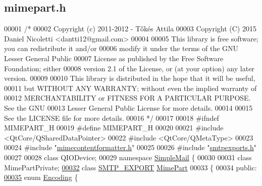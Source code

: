 \hypertarget{mimepart_8h_source}{}\subsection{mimepart.\+h}
\label{mimepart_8h_source}

\begin{DoxyCode}
00001 \textcolor{comment}{/*}
00002 \textcolor{comment}{  Copyright (c) 2011-2012 - Tőkés Attila}
00003 \textcolor{comment}{  Copyright (C) 2015 Daniel Nicoletti <dantti12@gmail.com>}
00004 \textcolor{comment}{}
00005 \textcolor{comment}{  This library is free software; you can redistribute it and/or}
00006 \textcolor{comment}{  modify it under the terms of the GNU Lesser General Public}
00007 \textcolor{comment}{  License as published by the Free Software Foundation; either}
00008 \textcolor{comment}{  version 2.1 of the License, or (at your option) any later version.}
00009 \textcolor{comment}{}
00010 \textcolor{comment}{  This library is distributed in the hope that it will be useful,}
00011 \textcolor{comment}{  but WITHOUT ANY WARRANTY; without even the implied warranty of}
00012 \textcolor{comment}{  MERCHANTABILITY or FITNESS FOR A PARTICULAR PURPOSE.  See the GNU}
00013 \textcolor{comment}{  Lesser General Public License for more details.}
00014 \textcolor{comment}{}
00015 \textcolor{comment}{  See the LICENSE file for more details.}
00016 \textcolor{comment}{*/}
00017 
00018 \textcolor{preprocessor}{#ifndef MIMEPART\_H}
00019 \textcolor{preprocessor}{#define MIMEPART\_H}
00020 
00021 \textcolor{preprocessor}{#include <QtCore/QSharedDataPointer>}
00022 \textcolor{preprocessor}{#include <QtCore/QMetaType>}
00023 
00024 \textcolor{preprocessor}{#include "\hyperlink{mimecontentformatter_8h}{mimecontentformatter.h}"}
00025 
00026 \textcolor{preprocessor}{#include "\hyperlink{smtpexports_8h}{smtpexports.h}"}
00027 
00028 \textcolor{keyword}{class }QIODevice;
00029 \textcolor{keyword}{namespace }\hyperlink{namespace_simple_mail}{SimpleMail} \{
00030 
00031 \textcolor{keyword}{class }MimePartPrivate;
\hyperlink{class_simple_mail_1_1_mime_part}{00032} \textcolor{keyword}{class }\hyperlink{smtpexports_8h_ac580c9660cb24a34b13807f4eb0e1bd0}{SMTP\_EXPORT} \hyperlink{class_simple_mail_1_1_mime_part}{MimePart}
00033 \{
00034 \textcolor{keyword}{public}:
\hyperlink{class_simple_mail_1_1_mime_part_ae67a2f5406958b95b18bf31a7bbeb5c9}{00035}     \textcolor{keyword}{enum} \hyperlink{class_simple_mail_1_1_mime_part_ae67a2f5406958b95b18bf31a7bbeb5c9}{Encoding} \{        

\end{DoxyCode}
